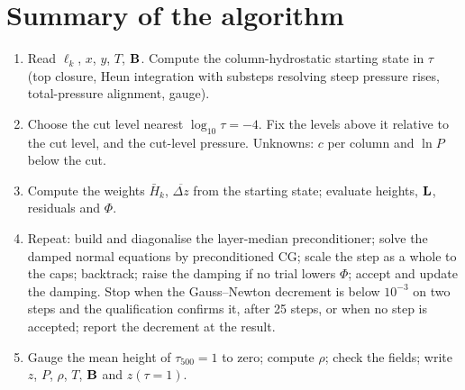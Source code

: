 \adjointpoissontrue


\section{Summary of the algorithm}
\begin{enumerate}
\item Read $\ell_k$, $x$, $y$, $T$, $\mathbf B$. Compute the column-hydrostatic starting state in $\tau$ (top closure, Heun
integration with substeps resolving steep pressure rises, total-pressure alignment, gauge).
\item Choose the cut level nearest $\log_{10}\tau=-4$. Fix the levels above it relative to the cut level, and the cut-level
pressure. Unknowns: $c$ per column and $\ln P$ below the cut.
\item Compute the weights $\bar H_k$, $\overline{\Delta z}$ from the starting state; evaluate heights, $\mathbf L$, residuals and $\Phi$.
\item Repeat: build and diagonalise the layer-median preconditioner; solve the damped normal equations by preconditioned CG;
scale the step as a whole to the caps; backtrack; raise the damping if no trial lowers $\Phi$; accept and update the damping.
Stop when the Gauss--Newton decrement is below $10^{-3}$ on two steps and the qualification confirms it, after 25 steps,
or when no step is accepted; report the decrement at the result.
\item Gauge the mean height of $\tau_{500}=1$ to zero; compute $\rho$; check the fields; write $z$, $P$, $\rho$, $T$, $\mathbf B$ and $z(\tau=1)$.
\end{enumerate}

